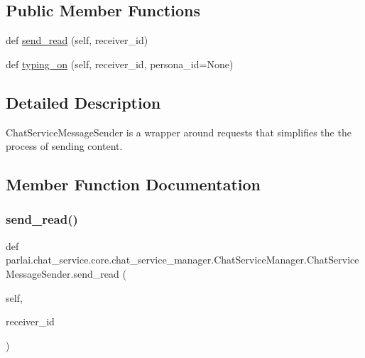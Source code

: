 \subsection*{Public Member Functions}
\begin{DoxyCompactItemize}
\item 
def \hyperlink{classparlai_1_1chat__service_1_1core_1_1chat__service__manager_1_1ChatServiceManager_1_1ChatServiceMessageSender_ad3afa9b59aa1bf4730a392e2e8257d4a}{send\+\_\+read} (self, receiver\+\_\+id)
\item 
def \hyperlink{classparlai_1_1chat__service_1_1core_1_1chat__service__manager_1_1ChatServiceManager_1_1ChatServiceMessageSender_a54162f1c14b3015386dd22a102269a5a}{typing\+\_\+on} (self, receiver\+\_\+id, persona\+\_\+id=None)
\end{DoxyCompactItemize}


\subsection{Detailed Description}
\begin{DoxyVerb}ChatServiceMessageSender is a wrapper around requests that simplifies the the
process of sending content.
\end{DoxyVerb}
 

\subsection{Member Function Documentation}
\mbox{\label{classparlai_1_1chat__service_1_1core_1_1chat__service__manager_1_1ChatServiceManager_1_1ChatServiceMessageSender_ad3afa9b59aa1bf4730a392e2e8257d4a}} 
\subsubsection{\texorpdfstring{send\+\_\+read()}{send\_read()}}
{\footnotesize\ttfamily def parlai.\+chat\+\_\+service.\+core.\+chat\+\_\+service\+\_\+manager.\+Chat\+Service\+Manager.\+Chat\+Service\+Message\+Sender.\+send\+\_\+read (\begin{DoxyParamCaption}\item[{}]{self,  }\item[{}]{receiver\+\_\+id }\end{DoxyParamCaption})}

